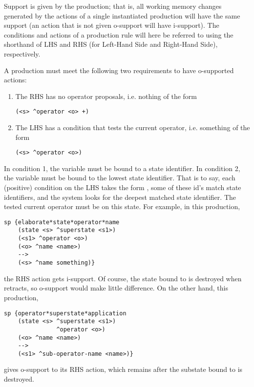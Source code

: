 Support is given by the production; that is, all working memory changes generated by the actions of a single instantiated production will have the same support (an action that is not given o-support will have i-support). The conditions and actions of a production rule will here be referred to using the shorthand of LHS and RHS (for Left-Hand Side and Right-Hand Side), respectively.

A production must meet the following two requirements to have o-supported actions:
\begin{enumerate}
	\item The RHS has no operator proposals, i.e. nothing of the form \begin{verbatim}(<s> ^operator <o> +) \end{verbatim}
	\item The LHS has a condition that tests the current operator, i.e. something of the form
	\begin{verbatim}(<s> ^operator <o>)\end{verbatim}
\end{enumerate}

In condition 1, the variable  must be bound to a state identifier.
In condition 2, the variable  must be bound to the lowest state identifier. That is to say, each (positive) condition on the LHS takes the form , some of these id's match state identifiers, and the system looks for the deepest matched state identifier. The tested current operator must be on this state. For example, in this production,

\begin{verbatim}
sp {elaborate*state*operator*name
    (state <s> ^superstate <s1>)
    (<s1> ^operator <o>)
    (<o> ^name <name>)
    -->
    (<s> ^name something)}
\end{verbatim}

the RHS action gets i-support. Of course, the state bound to  is destroyed when  retracts, so o-support would make little difference. On the other hand, this production,

\begin{verbatim}
sp {operator*superstate*application
    (state <s> ^superstate <s1>)
               ^operator <o>)
    (<o> ^name <name>)
    -->
    (<s1> ^sub-operator-name <name>)}
\end{verbatim}

gives o-support to its RHS action, which remains after the substate bound to  is destroyed. 

